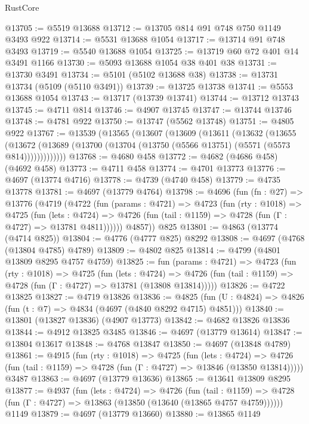 \begin{lexlean}{RustCore}
\begin{coremodule}
@13705 := @5519 @13688
@13712 := @13705 @814 @91 @748 @750 @1149 @3493 @922
@13714 := @5531 @13688 @1054
@13717 := @13714 @91 @748 @3493
@13719 := @5540 @13688 @1054
@13725 := @13719 @60 @72 @401 @14 @3491 @1166
@13730 := @5093 @13688 @1054 @38 @401 @38
@13731 := @13730 @3491
@13734 := @5101 (@5102 @13688 @38)
@13738 := @13731 @13734 (@5109 (@5110 @3491))
@13739 := @13725 @13738
@13741 := @5553 @13688 @1054
@13743 := @13717 (@13739 @13741)
@13744 := @13712 @13743
@13745 := @4711 @814
@13746 := @4907 @13745
@13747 := @13744 @13746
@13748 := @4781 @922
@13750 := @13747 (@5562 @13748)
@13751 := @4805 @922
@13767 := @13539
    (@13565
      (@13607
        (@13609
          (@13611
            (@13632
              (@13655
                (@13672
                  (@13689 (@13700 (@13704 (@13750 (@5566 @13751) (@5571 (@5573 @814)))))))))))))
@13768 := @4680 @458
@13772 := @4682 (@4686 @458) (@4692 @458)
@13773 := @4711 @458
@13774 := @4701 @13773
@13776 := @4697 (@13774 @4716)
@13778 := @4739 (@4740 @458)
@13779 := @4735 @13778
@13781 := @4697 (@13779 @4764)
@13798 := @4696
    (fun (fn : @27) =>
    @13776
      (@4719
        (@4722
          (fun (params : @4721) =>
          @4723
            (fun (rty : @1018) =>
            @4725
              (fun (lets : @4724) =>
              @4726 (fun (tail : @1159) => @4728 (fun (Γ : @4727) => @13781 @4811))))))
        @4857))
    @825
@13801 := @4863 (@13774 (@4714 @825))
@13804 := @4776 (@4777 @825) @8292
@13808 := @4697 (@4768 (@13804 @4785) @4789)
@13809 := @4802 @825
@13814 := @4799 (@4801 @13809 @8295 @4757 @4759)
@13825 := fun (params : @4721) =>
  @4723
    (fun (rty : @1018) =>
    @4725
      (fun (lets : @4724) =>
      @4726 (fun (tail : @1159) => @4728 (fun (Γ : @4727) => @13781 (@13808 @13814)))))
@13826 := @4722 @13825
@13827 := @4719 @13826
@13836 := @4825 (fun (U : @4824) => @4826 (fun (t : @7) => @4834 (@4697 (@4840 @8292 @4715) @4851)))
@13840 := @13801 (@13827 @13836) (@4907 @13773)
@13842 := @4682 @13826 @13836
@13844 := @4912 @13825 @3485
@13846 := @4697 (@13779 @13614)
@13847 := @13804 @13617
@13848 := @4768 @13847
@13850 := @4697 (@13848 @4789)
@13861 := @4915
    (fun (rty : @1018) =>
    @4725
      (fun (lets : @4724) =>
      @4726 (fun (tail : @1159) => @4728 (fun (Γ : @4727) => @13846 (@13850 @13814)))))
    @3487
@13863 := @4697 (@13779 @13636)
@13865 := @13641 @13809 @8295
@13877 := @4937
    (fun (lets : @4724) =>
    @4726
      (fun (tail : @1159) =>
      @4728 (fun (Γ : @4727) => @13863 (@13850 (@13640 (@13865 @4757 @4759))))))
    @1149
@13879 := @4697 (@13779 @13660)
@13880 := @13865 @1149

\end{coremodule}
\end{lexlean}
